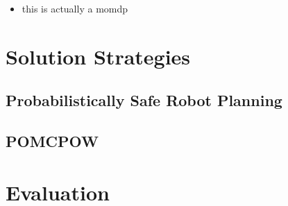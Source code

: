 
\begin{itemize}
  \item this is actually a \ac{momdp}
\end{itemize}

\section{Solution Strategies}\label{sec:hri-solutions}
\subsection{Probabilistically Safe Robot Planning}\label{sec:hri-baseline}
\subsection{POMCPOW}\label{sec:hri-planners}
\section{Evaluation}\label{sec:hri-evaluation}
